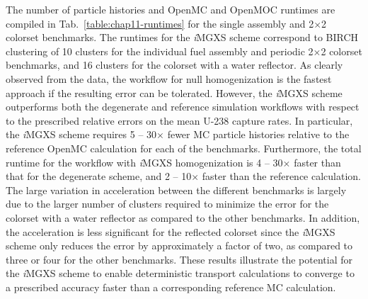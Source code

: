 The number of particle histories and OpenMC and OpenMOC runtimes are compiled in Tab.~\ref{table:chap11-runtimes} for the single assembly and 2$\times$2 colorset benchmarks. The runtimes for the \textit{i}\ac{MGXS} scheme correspond to BIRCH clustering of 10 clusters for the individual fuel assembly and periodic 2$\times$2 colorset benchmarks, and 16 clusters for the colorset with a water reflector. As clearly observed from the data, the workflow for null homogenization is the fastest approach if the resulting error can be tolerated. However, the \textit{i}\ac{MGXS} scheme outperforms both the degenerate and reference simulation workflows with respect to the prescribed relative errors on the mean U-238 capture rates. In particular, the \textit{i}\ac{MGXS} scheme requires 5 -- 30$\times$ fewer \ac{MC} particle histories relative to the reference OpenMC calculation for each of the benchmarks. Furthermore, the total runtime for the workflow with \textit{i}\ac{MGXS} homogenization is 4 -- 30$\times$ faster than that for the degenerate scheme, and 2 -- 10$\times$ faster than the reference calculation. The large variation in acceleration between the different benchmarks is largely due to the larger number of clusters required to minimize the error for the colorset with a water reflector as compared to the other benchmarks. In addition, the acceleration is less significant for the reflected colorset since the \textit{i}\ac{MGXS} scheme only reduces the error by approximately a factor of two, as compared to three or four for the other benchmarks. These results illustrate the potential for the \textit{i}\ac{MGXS} scheme to enable deterministic transport calculations to converge to a prescribed accuracy faster than a corresponding reference \ac{MC} calculation.



